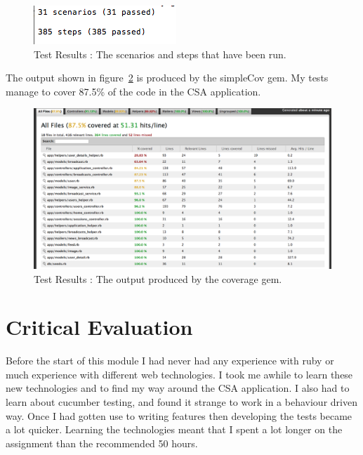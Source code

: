 \documentclass[10pt,a4paper,titlepage]{article}
\begin{document}
\begin{figure}[H]
\begin{center}
\includegraphics[scale=1.0]{include/cucumber_results.png}  
\caption{Test Results : The scenarios and steps that have been run. }
\label{fig:cucumberOutput}
\end{center}
\end{figure}

The output shown in figure~\ref{fig:coverageOutput} is produced by the simpleCov gem. My tests manage to cover 87.5\% of the code in the CSA application. 

\begin{figure}[H]
\begin{center}
\includegraphics[scale=0.35]{include/coverage.png}  
\caption{Test Results : The output produced by the coverage gem. }
\label{fig:coverageOutput}
\end{center}
\end{figure}

\section{Critical Evaluation}

Before the start of this module I had never had any experience with ruby or much experience with different web technologies. I took me awhile to learn these new technologies and to find my way around the CSA application. I also had to learn about cucumber testing, and found it strange to work in a behaviour driven way. Once I had gotten use to writing features then developing the tests became a lot quicker. Learning the technologies meant that I spent a lot longer on the assignment than the recommended 50 hours.\\
\end{document}
